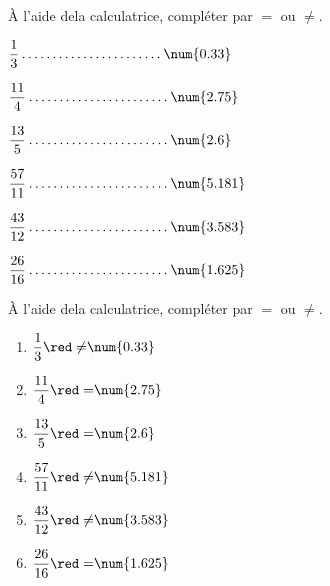 \begin{exercice*}
    À l'aide dela calculatrice, compléter par $=$ ou $\neq$.
    \begin{multicols}{2}        
        \begin{enumerate}
            \begin{spacing}{1.5}
                \item $\dfrac{1}{3}   \makebox[0.3\linewidth]{\dotfill} \num{0.33}$
                \item $\dfrac{11}{4}  \makebox[0.3\linewidth]{\dotfill} \num{2.75}$
                \item $\dfrac{13}{5}  \makebox[0.3\linewidth]{\dotfill} \num{2.6}$
                \item $\dfrac{57}{11} \makebox[0.3\linewidth]{\dotfill} \num{5.181}$
                \item $\dfrac{43}{12} \makebox[0.3\linewidth]{\dotfill} \num{3.583}$
                \item $\dfrac{26}{16} \makebox[0.3\linewidth]{\dotfill} \num{1.625}$
            \end{spacing}
        \end{enumerate}        
    \end{multicols}
\end{exercice*}
\begin{corrige}
    À l'aide dela calculatrice, compléter par $=$ ou $\neq$.
    \begin{multicols}{3}
        \begin{spacing}{1.5}
            \begin{enumerate}
                \item $\dfrac{1}{3}   {\red \neq} \num{0.33}$
                \item $\dfrac{11}{4}  {\red =} \num{2.75}$
                \item $\dfrac{13}{5}  {\red =} \num{2.6}$
                \item $\dfrac{57}{11} {\red \neq} \num{5.181}$
                \item $\dfrac{43}{12} {\red \neq} \num{3.583}$
                \item $\dfrac{26}{16} {\red =} \num{1.625}$
            \end{enumerate}
        \end{spacing}
    \end{multicols}

\end{corrige}

